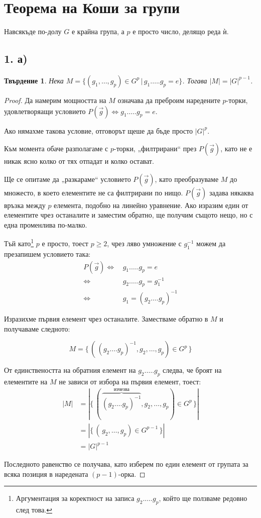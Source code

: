 \documentclass{article}
\newtheorem*{prop}{Твърдение}
\begin{document}
\section*{Теорема на Коши за групи}
Навсякъде по-долу $G$ е крайна група, а $p$ е просто число, делящо реда ѝ.
\subsection*{1. а)}
\begin{prop}
    Нека $M = \{(g_1, \dots, g_p) \in G^p \, | \, g_1.\dots.g_p = e\}$.
    Тогава $|M| = |G|^{p-1}$.
\end{prop}
\begin{proof}
    Да намерим мощността на $M$ означава да преброим наредените $p$-торки, удовлетворяащи условието
    $P(\vec g) \Leftrightarrow {g_1.\dots. g_p = e}$.

    Ако нямахме такова условие, отговорът щеше да бъде просто $|G|^p$.

    Към момента обаче разполагаме с $p$-торки, „филтрирани“ през $P(\vec g)$, като не е никак ясно колко от тях отпадат и колко остават.

    Ще се опитаме да „разкараме“ условието $P(\vec g)$, като преобразуваме $M$ до множесто, в което елементите не са филтрирани по нищо.
    $P(\vec g)$ задава някаква връзка между $p$ елемента, подобно на линейно уравнение. Ако изразим един от елементите чрез останалите и заместим обратно, ще получим същото нещо, но с една променлива по-малко.

    Тъй като\footnote{Аргументация за коректност на записа $g_2 . \dots . g_p$, който ще ползваме редовно след това.} $p$ е просто, тоест $p \ge 2$, чрез ляво умножение с $g_1^{-1}$ можем да презапишем условието така:
    \begin{align*}
        P(\vec g) \Leftrightarrow \, &g_1.\dots.g_p = e \\
        \Leftrightarrow \, &g_2. \dots . g_p = g_1^{-1} \\
        \Leftrightarrow \, &g_1 = (g_2 . \dots g_p)^{-1}
    \end{align*}

    Изразихме първия елемент чрез останалите. Заместваме обратно в $M$ и получаваме следното:

    $$M = \{ \, (\,(g_2 . \dots g_p)^{-1}, g_2, \dots, g_p) \in G^p \,\}$$

    От единствеността на обратния елемент на $g_2.\dots.g_p$ следва, че броят на елементите на $M$ не зависи от избора на първия елемент, тоест:
    \begin{align*}
        |M| &= |\{ \, (\,\overbrace{(g_2 . \dots g_p)^{-1}}^{\text{изчезва}}, g_2, \dots, g_p) \in G^p \,\}|\\
        &= |\{ \, (\, g_2, \dots, g_p) \in G^{p-1} \,\}|\\
        &= {|G|}^{p-1}
    \end{align*}

    Последното равенство се получава, като изберем по един елемент от групата за всяка позиция в наредената ${(p-1)}$-орка.
\end{proof}
\end{document}
